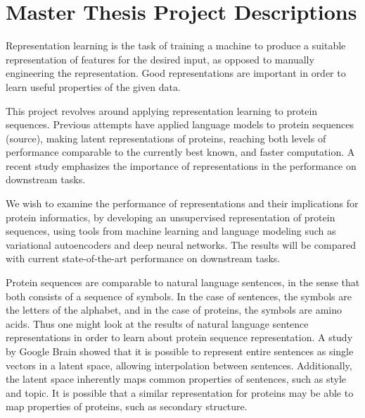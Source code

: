 \documentclass[a4paper,11pt]{report}
\begin{document}


\section*{Master Thesis Project Descriptions}



Representation learning is the task of training a machine to produce a suitable representation of features for the desired input, as opposed to manually engineering the representation. Good representations are important in order to learn useful properties of the given data.

This project revolves around applying representation learning to protein sequences. Previous attempts have applied language models to protein sequences (source), making latent representations of proteins, reaching both levels of performance comparable to the currently best known, and faster computation. A recent study \cite{rao2019evaluating} emphasizes the importance of representations in the performance on downstream tasks.

We wish to examine the performance of representations and their implications for protein informatics, by developing an unsupervised representation of protein sequences, using tools from machine learning and language modeling such as variational autoencoders and deep neural networks. The results will be compared with current state-of-the-art performance on downstream tasks.

Protein sequences are comparable to natural language sentences, in the sense that both consists of a sequence of symbols. In the case of sentences, the symbols are the letters of the alphabet, and in the case of proteins, the symbols are amino acids. Thus one might look at the results of natural language sentence representations in order to learn about protein sequence representation. A study by Google Brain \cite{bowman2015generating} showed that it is possible to represent entire sentences as single vectors in a latent space, allowing interpolation between sentences. Additionally, the latent space inherently maps common properties of sentences, such as style and topic. It is possible that a similar representation for proteins may be able to map properties of proteins, such as secondary structure.
\end{document}
